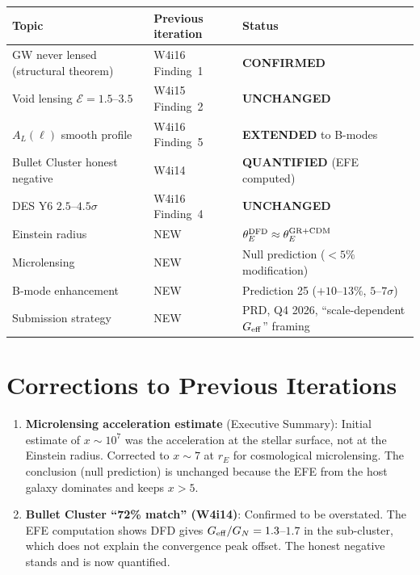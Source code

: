 \documentclass[11pt,a4paper]{article}
\newcommand{\Geff}{G_{\rm eff}}
\begin{document}
\begin{center}
\begin{tabular}{lll}
\toprule
Topic & Previous iteration & Status \\
\midrule
GW never lensed (structural theorem) & W4i16 Finding~1 & \textbf{CONFIRMED} \\
Void lensing $\mathcal{E} = 1.5$--$3.5$ & W4i15 Finding~2 & \textbf{UNCHANGED} \\
$A_L(\ell)$ smooth profile & W4i16 Finding~5 & \textbf{EXTENDED} to B-modes \\
Bullet Cluster honest negative & W4i14 & \textbf{QUANTIFIED} (EFE computed) \\
DES Y6 $2.5$--$4.5\sigma$ & W4i16 Finding~4 & \textbf{UNCHANGED} \\
Einstein radius & NEW & $\theta_E^{\rm DFD} \approx \theta_E^{\rm GR+CDM}$ \\
Microlensing & NEW & Null prediction ($< 5\%$ modification) \\
B-mode enhancement & NEW & Prediction 25 ($+10$--$13\%$, $5$--$7\sigma$) \\
Submission strategy & NEW & PRD, Q4 2026, ``scale-dependent $\Geff$'' framing \\
\bottomrule
\end{tabular}
\end{center}


\section*{Corrections to Previous Iterations}

\begin{enumerate}
\item \textbf{Microlensing acceleration estimate} (Executive Summary):
  Initial estimate of $x \sim 10^7$ was the acceleration at the stellar
  surface, not at the Einstein radius.  Corrected to $x \sim 7$ at
  $r_E$ for cosmological microlensing.  The conclusion (null prediction)
  is unchanged because the EFE from the host galaxy dominates and keeps
  $x > 5$.

\item \textbf{Bullet Cluster ``72\% match'' (W4i14)}: Confirmed to be
  overstated.  The EFE computation shows DFD gives $\Geff/G_N =
  1.3$--$1.7$ in the sub-cluster, which does not explain the convergence
  peak offset.  The honest negative stands and is now quantified.
\end{enumerate}
\end{document}
